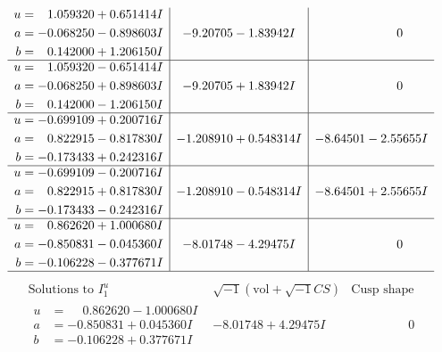 \documentclass[1p]{elsarticle_modified}
\theoremstyle{definition}
\newcommand{\I}{\sqrt{-1}}
\begin{document}
$$\begin{array}{c|c|c}
\begin{aligned}
u &= \phantom{-}1.059320 + 0.651414 I \\
a &= -0.068250 - 0.898603 I \\
b &= \phantom{-}0.142000 + 1.206150 I\end{aligned}
 & -9.20705 - 1.83942 I & \phantom{-0.000000 } 0 \\ \hline\begin{aligned}
u &= \phantom{-}1.059320 - 0.651414 I \\
a &= -0.068250 + 0.898603 I \\
b &= \phantom{-}0.142000 - 1.206150 I\end{aligned}
 & -9.20705 + 1.83942 I & \phantom{-0.000000 } 0 \\ \hline\begin{aligned}
u &= -0.699109 + 0.200716 I \\
a &= \phantom{-}0.822915 - 0.817830 I \\
b &= -0.173433 + 0.242316 I\end{aligned}
 & -1.208910 + 0.548314 I & -8.64501 - 2.55655 I \\ \hline\begin{aligned}
u &= -0.699109 - 0.200716 I \\
a &= \phantom{-}0.822915 + 0.817830 I \\
b &= -0.173433 - 0.242316 I\end{aligned}
 & -1.208910 - 0.548314 I & -8.64501 + 2.55655 I \\ \hline\begin{aligned}
u &= \phantom{-}0.862620 + 1.000680 I \\
a &= -0.850831 - 0.045360 I \\
b &= -0.106228 - 0.377671 I\end{aligned}
 & -8.01748 - 4.29475 I & \phantom{-0.000000 } 0\\
 \hline 
 \end{array}$$\newpage$$\begin{array}{c|c|c}  
\text{Solutions to }I^u_{1}& \I (\text{vol} + \sqrt{-1}CS) & \text{Cusp shape}\\
 \hline 
\begin{aligned}
u &= \phantom{-}0.862620 - 1.000680 I \\
a &= -0.850831 + 0.045360 I \\
b &= -0.106228 + 0.377671 I\end{aligned}
 & -8.01748 + 4.29475 I & \phantom{-0.000000 } 0 \\ \hline\begin{aligned}

\end{aligned}
\end{array}$$
\end{document}
